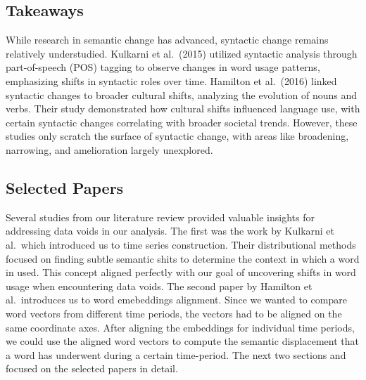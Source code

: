 \subsection{Takeaways}\label{subsec:takeaways3}
While research in semantic change has advanced, syntactic change remains relatively understudied.
Kulkarni et al.\ (2015) utilized syntactic analysis through part-of-speech (POS) tagging to observe changes in word usage patterns, emphasizing shifts in syntactic roles over time.
Hamilton et al.\ (2016) linked syntactic changes to broader cultural shifts, analyzing the evolution of nouns and verbs.
Their study demonstrated how cultural shifts influenced language use, with certain syntactic changes correlating with broader societal trends.
However, these studies only scratch the surface of syntactic change, with areas like broadening, narrowing, and amelioration largely unexplored.

\subsection{Selected Papers}\label{subsec:selected-papers}
Several studies from our literature review provided valuable insights for addressing data voids in our analysis.
The first was the work by Kulkarni et al.\ which introduced us to time series construction.
Their distributional methods focused on finding subtle semantic shits to determine the context in which a word in used.
This concept aligned perfectly with our goal of uncovering shifts in word usage when encountering data voids.
The second paper by Hamilton et al.\ introduces us to word emebeddings alignment.
Since we wanted to compare word vectors from different time periods, the vectors had to be aligned on the same coordinate axes.
After aligning the embeddings for individual time periods,
we could use the aligned word vectors to compute the semantic displacement that a word has underwent during a certain time-period.
The next two sections  and  focused on the selected papers in detail.